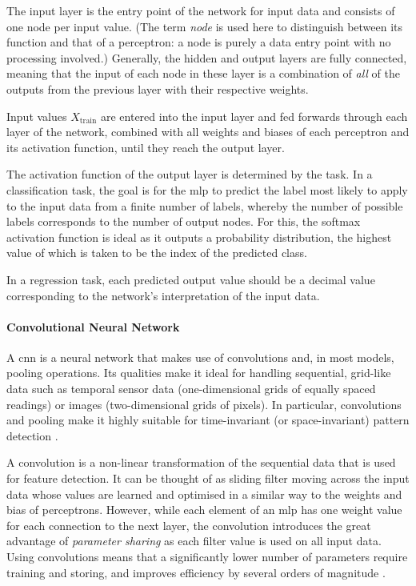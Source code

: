 

The input layer is the entry point of the network for input data and consists of one node per input value. (The term \textit{node} is used here to distinguish between its function and that of a perceptron: a node is purely a data entry point with no processing involved.) Generally, the hidden and output layers are fully connected, meaning that the input of each node in these layer is a combination of \textit{all} of the outputs from the previous layer with their respective weights.

Input values \(X_{\text{train}}\) are entered into the input layer and fed forwards through each layer of the network, combined with all weights and biases of each perceptron and its activation function, until they reach the output layer.

The activation function of the output layer is determined by the task. In a classification task, the goal is for the \ac{mlp} to predict the label most likely to apply to the input data from a finite number of labels, whereby the number of possible labels corresponds to the number of output nodes. For this, the softmax activation function is ideal \cite[p. 184]{goodfellow_deep_2016} as it outputs a probability distribution, the highest value of which is taken to be the index of the predicted class.

In a regression task, each predicted output value should be a decimal value corresponding to the network's interpretation of the input data.

\paragraph*{Convolutional Neural Network}
A \ac{cnn} is a neural network that makes use of convolutions and, in most models, pooling operations. Its qualities make it ideal for handling sequential, grid-like data such as temporal sensor data (one-dimensional grids of equally spaced readings) or images (two-dimensional grids of pixels). In particular, convolutions and pooling make it highly suitable for time-invariant (or space-invariant) pattern detection \cite[]{goodfellow_deep_2016}.

A convolution is a non-linear transformation of the sequential data that is used for feature detection. It can be thought of as sliding filter moving across the input data whose values are learned and optimised in a similar way to the weights and bias of perceptrons. However, while each element of an \ac{mlp} has one weight value for each connection to the next layer, the convolution introduces the great advantage of \textit{parameter sharing} as each filter value is used on all input data. Using convolutions means that a significantly lower number of parameters require training and storing, and improves efficiency by several orders of magnitude \cite[]{goodfellow_deep_2016}.

